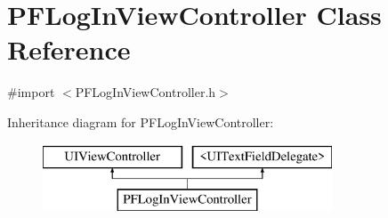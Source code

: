 \hypertarget{interface_p_f_log_in_view_controller}{}\section{P\+F\+Log\+In\+View\+Controller Class Reference}
\label{interface_p_f_log_in_view_controller}


{\ttfamily \#import $<$P\+F\+Log\+In\+View\+Controller.\+h$>$}

Inheritance diagram for P\+F\+Log\+In\+View\+Controller\+:\begin{figure}[H]
\begin{center}
\leavevmode
\includegraphics[height=2.000000cm]{interface_p_f_log_in_view_controller}
\end{center}
\end{figure}
